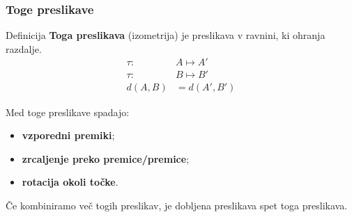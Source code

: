         \begin{frame}
            \frametitle{Toge preslikave}
            
            \begin{alertblock}{Definicija}
                \textbf{Toga preslikava} (izometrija) je preslikava v ravnini, ki ohranja razdalje.
                \begin{align*}
                    \tau:~ &A \mapsto A' \\ 
                    \tau:~ &B \mapsto B' \\ 
                    d(A,B)&=d(A',B')
                \end{align*}
            \end{alertblock}

            \begin{block}{}
                Med toge preslikave spadajo:
                    \begin{itemize}
                        \item \textbf{vzporedni premiki};
                        \item \textbf{zrcaljenje preko premice/premice};
                        \item \textbf{rotacija okoli točke}.
                    \end{itemize}

                Če kombiniramo več togih preslikav, je dobljena preslikava spet toga preslikava.
            \end{block}

        \end{frame}


